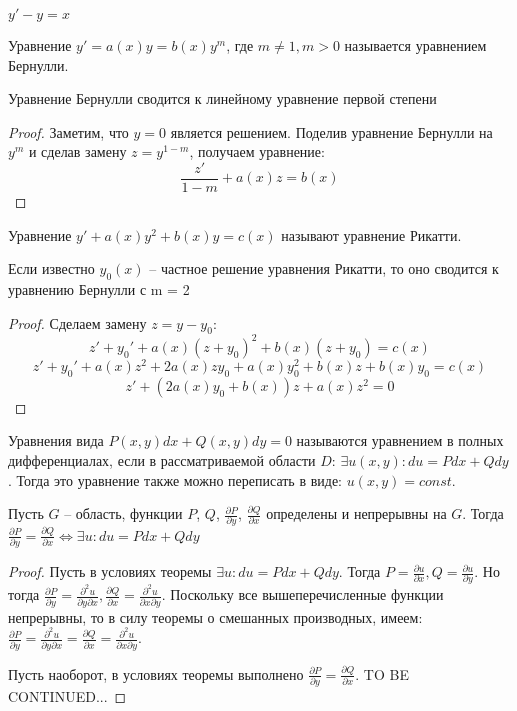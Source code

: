 \documentclass[document.tex]{subfiles}
\begin{document}
\begin{example}
$y' - y = x$
\end{example}
\begin{definition}
Уравнение $y' = a(x)y = b(x)y^m$, где $m \neq 1, m > 0$ называется уравнением Бернулли.
\end{definition}
\begin{statement}
Уравнение Бернулли сводится к линейному уравнение первой степени
\end{statement}
\begin{proof}
Заметим, что $y = 0$ является решением. Поделив уравнение Бернулли на $y^m$ и сделав замену $z = y^{1-m}$, получаем уравнение:
$$\frac{z'}{1-m} + a(x)z = b(x)$$
\end{proof}
\begin{definition}
Уравнение $y' + a(x)y^2 + b(x)y = c(x)$ называют уравнение Рикатти.
\end{definition}
\begin{statement}
Если известно $y_0(x)$ -- частное решение уравнения Рикатти, то оно сводится к уравнению Бернулли с m = 2
\end{statement}
\begin{proof}
Сделаем замену $z = y - y_0$:
$$z' + y_0' + a(x)(z+y_0)^2 + b(x)(z+y_0) = c(x)$$
$$z' + y_0' + a(x)z^2 + 2a(x)zy_0 + a(x)y_0^2 + b(x)z + b(x)y_0 = c(x)$$
$$z' + (2a(x)y_0 + b(x))z + a(x)z^2 = 0$$
\end{proof}
\begin{definition}
Уравнения вида $P(x, y)dx + Q(x, y)dy = 0$ называются уравнением в полных дифференциалах, если в рассматриваемой области $D$: $\exists u(x, y): du = Pdx + Qdy$. Тогда это уравнение также можно переписать в виде: $u(x, y) = const$.
\end{definition}
\begin{theorem}
Пусть $G$ -- область, функции $P$, $Q$, $\frac{\partial P}{\partial y}$, $\frac{\partial Q}{\partial x}$ определены и непрерывны на $G$. Тогда $\frac{\partial P}{\partial y} = \frac{\partial Q}{\partial x} \Leftrightarrow \exists u : du = Pdx + Qdy$
\end{theorem}
\begin{proof}
Пусть в условиях теоремы $\exists u : du = Pdx+Qdy$. Тогда $P = \frac{\partial u}{\partial x},
Q = \frac{\partial u}{\partial y}$. Но тогда $\frac{\partial P}{\partial y} = \frac{\partial^2 u}{\partial y \partial x}, \frac{\partial Q}{\partial x} = \frac{\partial ^2 u}{\partial x \partial y}$. Поскольку все вышеперечисленные функции непрерывны, то в силу теоремы о смешанных производных, имеем: $\frac{\partial P}{\partial y} = \frac{\partial^2 u}{\partial y \partial x} = \frac{\partial Q}{\partial x} = \frac{\partial ^2 u}{\partial x \partial y}$.

Пусть наоборот, в условиях теоремы выполнено $\frac{\partial P}{\partial y} = \frac{\partial Q}{\partial x}$.
TO BE CONTINUED...
\end{proof}
\end{document}
